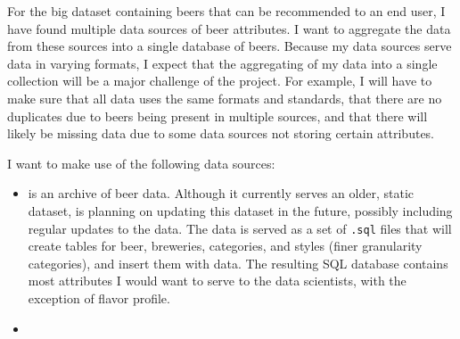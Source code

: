 \documentclass[sigconf, natbib=true]{acmart}
\begin{document}
For the big dataset containing beers that can be recommended to an end user, I have found multiple data sources of beer attributes.
I want to aggregate the data from these sources into a single database of beers. 
Because my data sources serve data in varying formats, I expect that the aggregating of my data into a single collection will be a major challenge of the project.
For example, I will have to make sure that all data uses the same formats and standards, that there are no duplicates due to beers being present in multiple sources, and that there will likely be missing data due to some data sources not storing certain attributes.

I want to make use of the following data sources:
\begin{itemize}
    \item \citet{openbeerdb} is an archive of beer data.
    Although it currently serves an older, static dataset, \citeauthor{openbeerdb} is planning on updating this dataset in the future, possibly including regular updates to the data.
    The \citeauthor{openbeerdb} data is served as a set of \texttt{.sql} files that will create tables for beer, breweries, categories, and styles (finer granularity categories), and insert them with data.
    The resulting SQL database contains most attributes I would want to serve to the data scientists, with the exception of flavor profile.
    \item 
\end{itemize}


\def\bibfont{\small} %
 
\end{document}
